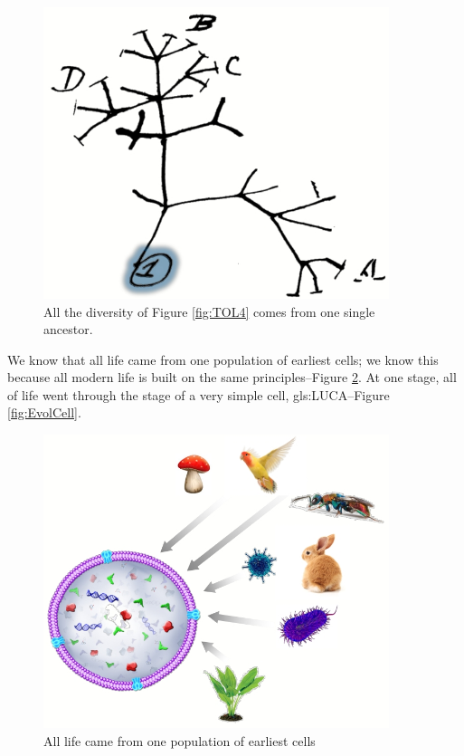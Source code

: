 \documentclass[]{article}
\begin{document}
\begin{figure}[H]
	\caption{All the diversity of Figure \ref{fig:TOL4} comes from one single ancestor.}\label{fig:TOL_root}
	\includegraphics[width=0.9\textwidth]{TOL_root}
\end{figure}

We know that all life came from one population of earliest cells; we know this because all modern life is built on the same principles--Figure \ref{fig:ModernCell}. At one stage, all of life went through the stage of a very simple cell, \gls{gls:LUCA}--Figure \ref{fig:EvolCell}.

\begin{figure}[H]
	\caption{All life came from one population of earliest cells}\label{fig:ModernCell}
	\includegraphics[width=0.9\textwidth]{ModernCell}
\end{figure}
\end{document}
